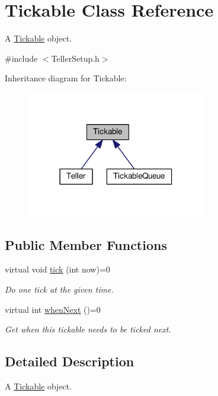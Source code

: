 \hypertarget{class_tickable}{}\section{Tickable Class Reference}
\label{class_tickable}


A \hyperlink{class_tickable}{Tickable} object.  




{\ttfamily \#include $<$Teller\+Setup.\+h$>$}



Inheritance diagram for Tickable\+:
\nopagebreak
\begin{figure}[H]
\begin{center}
\leavevmode
\includegraphics[width=222pt]{class_tickable__inherit__graph}
\end{center}
\end{figure}
\subsection*{Public Member Functions}
\begin{DoxyCompactItemize}
\item 
virtual void \hyperlink{class_tickable_a0ca181a29c3e1539e4221d2cbcfa83c2}{tick} (int now)=0
\begin{DoxyCompactList}\small\item\em Do one tick at the given time. \end{DoxyCompactList}\item 
virtual int \hyperlink{class_tickable_ac65be54f32d39d1450a37cf4acb1ad15}{when\+Next} ()=0
\begin{DoxyCompactList}\small\item\em Get when this tickable needs to be ticked next. \end{DoxyCompactList}\end{DoxyCompactItemize}


\subsection{Detailed Description}
A \hyperlink{class_tickable}{Tickable} object. 

